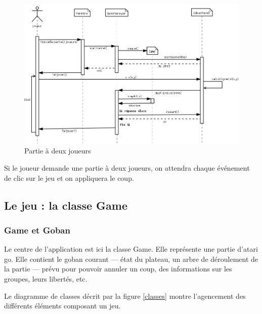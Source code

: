 \documentclass[11pt,a4paper,titlepage,french]{article}
\begin{document}
				\begin{figure}[hbt]
					\begin{center}
						\includegraphics[width=1.1\textwidth]{./IA_2J.png}
					\end{center}
					\caption{Partie à deux joueurs}
					\label{twoplayers}
				\end{figure}

				Si le joueur demande une partie à deux joueurs, on attendra chaque événement de clic sur le jeu et on appliquera le coup.

		\subsection{Le jeu : la classe Game}\label{howgame}


			\subsubsection{Game et Goban}

			Le centre de l'application est ici la classe Game. Elle représente une partie d'atari go. Elle contient le goban courant --- état du plateau, un arbre de déroulement de la partie --- prévu pour pouvoir annuler un coup, des informations sur les groupes, leurs libertés, etc.

			Le diagramme de classes décrit par la figure \ref{classes} montre l'agencement des différents éléments composant un jeu.
\end{document}
